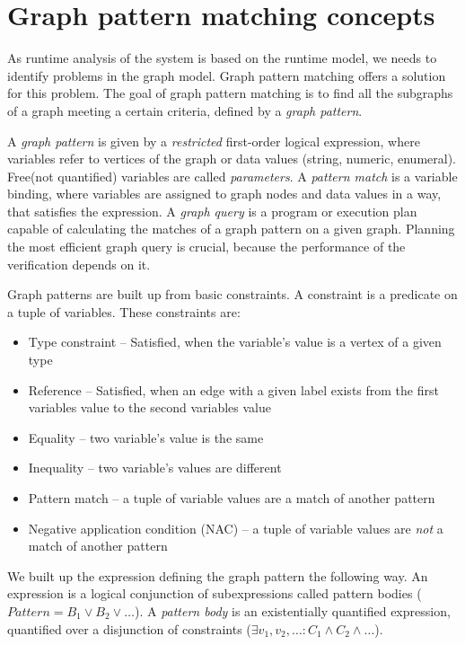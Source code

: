 \section{Graph pattern matching concepts}
\label{section:gpmc}

As runtime analysis of the system is based on the runtime model, we needs to identify problems in the graph model. 
Graph pattern matching offers a solution for this problem. 
The goal of graph pattern matching is to find all the subgraphs of a graph meeting a certain criteria, defined by a \emph{graph pattern}.

A \emph{graph pattern} is given by a \emph{restricted} first-order logical expression, where variables refer to vertices of the graph or data values (string, numeric, enumeral).
Free(not quantified) variables are called \emph{parameters}.  
A \emph{pattern match} is a variable binding, where variables are assigned to graph nodes and data values in a way, that satisfies the expression.
A \emph{graph query} is a program or execution plan capable of calculating the matches of a graph pattern on a given graph. 
Planning the most efficient graph query is crucial, because the performance of the verification depends on it.

Graph patterns are built up from basic constraints. 
A constraint is a predicate on a tuple of variables. 
These constraints are: 

\begin{itemize}
	\item Type constraint -- Satisfied, when the variable's value is a vertex of a given type
	\item Reference -- Satisfied, when an edge with a given label exists from the first variables value to the second variables value
	\item Equality -- two variable's value is the same
	\item Inequality -- two variable's values are different
	\item Pattern match -- a tuple of variable values are a match of another pattern
	\item Negative application condition (NAC) -- a tuple of variable values are \emph{not} a match of another pattern
\end{itemize}


We built up the expression defining the graph pattern the following way. 
An expression is a logical conjunction of subexpressions called pattern bodies ($Pattern = B_1 \vee B_2 \vee \dots$). 
A \emph{pattern body} is an existentially quantified expression, quantified over a disjunction of constraints ($\exists{} v_1, v_2, \dots : C_1 \wedge{} C_2 \wedge \dots$).

